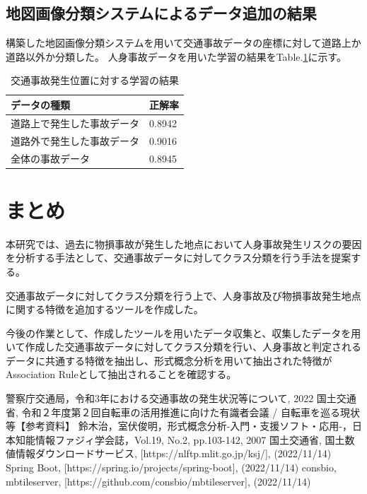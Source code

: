 \documentclass[a4j,8.5pt, twocolumn,fleqn]{jbook}
\begin{document}
\subsection{地図画像分類システムによるデータ追加の結果}
構築した地図画像分類システムを用いて交通事故データの座標に対して道路上か道路以外か分類した。
人身事故データを用いた学習の結果をTable.\ref{table_road}に示す。


\begin{table}[htb]
    \centering
    \caption{交通事故発生位置に対する学習の結果}
    \label{table_road}
    \begin{tabular}{|l|l|}
        \hline
        \textbf{データの種類} & \textbf{正解率} \\ \hline
        道路上で発生した事故データ   & 0.8942       \\ \hline
        道路外で発生した事故データ   & 0.9016       \\ \hline
        全体の事故データ        & 0.8945       \\ \hline
    \end{tabular}
\end{table}

\section{まとめ}
本研究では、過去に物損事故が発生した地点において人身事故発生リスクの要因を分析する手法として、交通事故データに対してクラス分類を行う手法を提案する。

交通事故データに対してクラス分類を行う上で、人身事故及び物損事故発生地点に関する特徴を追加するツールを作成した。

今後の作業として、作成したツールを用いたデータ収集と、収集したデータを用いて作成した交通事故データに対してクラス分類を行い、人身事故と判定されるデータに共通する特徴を抽出し、形式概念分析を用いて抽出された特徴がAssociation Ruleとして抽出されることを確認する。

\begin{thebibliography}{9}
    警察庁交通局，令和3年における交通事故の発生状況等について, 2022
    国土交通省, 令和２年度第２回自転車の活用推進に向けた有識者会議 / 自転車を巡る現状等【参考資料】
    鈴木治，室伏俊明，形式概念分析-入門・支援ソフト・応用-，日本知能情報ファジィ学会誌，Vol.19, No.2, pp.103-142, 2007
    国土交通省, 国土数値情報ダウンロードサービス, [https://nlftp.mlit.go.jp/ksj/], (2022/11/14)
    Spring Boot, [https://spring.io/projects/spring-boot], (2022/11/14)
    consbio, mbtileserver, [https://github.com/consbio/mbtileserver], (2022/11/14)
\end{thebibliography}
\end{document}
